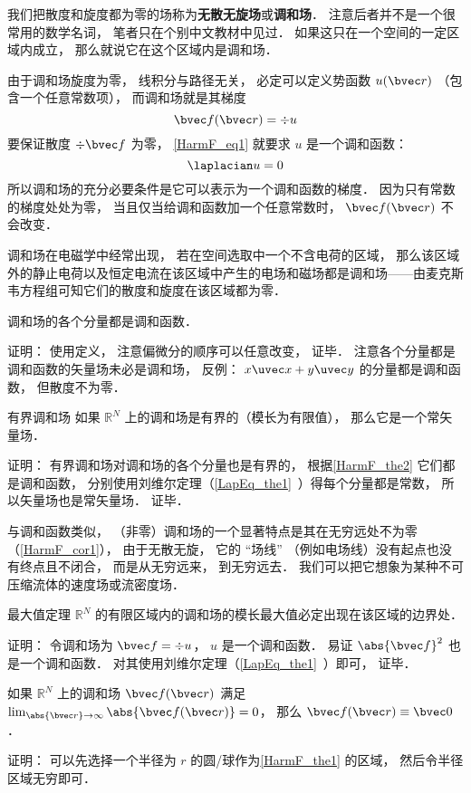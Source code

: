 

我们把散度和旋度都为零的场称为\textbf{无散无旋场}或\textbf{调和场}． 注意后者并不是一个很常用的数学名词， 笔者只在个别中文教材中见过． 如果这只在一个空间的一定区域内成立， 那么就说它在这个区域内是调和场．

由于调和场旋度为零， 线积分与路径无关， 必定可以定义势函数 $u(\bvec r)$ （包含一个任意常数项）， 而调和场就是其梯度
\begin{equation}\label{HarmF_eq1}
\bvec f(\bvec r) = \div u
\end{equation}
要保证散度 $\div \bvec f$ 为零， \autoref{HarmF_eq1} 就要求 $u$ 是一个调和函数：
\begin{equation}
\laplacian u = 0
\end{equation}
所以调和场的充分必要条件是它可以表示为一个调和函数的梯度． 因为只有常数的梯度处处为零， 当且仅当给调和函数加一个任意常数时， $\bvec f(\bvec r)$ 不会改变．

调和场在电磁学中经常出现， 若在空间选取中一个不含电荷的区域， 那么该区域外的静止电荷以及恒定电流在该区域中产生的电场和磁场都是调和场——由麦克斯韦方程组可知它们的散度和旋度在该区域都为零．

\begin{theorem}{}\label{HarmF_the2}
调和场的各个分量都是调和函数．
\end{theorem}
证明： 使用定义， 注意偏微分的顺序可以任意改变， 证毕． 注意各个分量都是调和函数的矢量场未必是调和场， 反例： $x\uvec x + y \uvec y$ 的分量都是调和函数， 但散度不为零．

\begin{corollary}{有界调和场}
如果 $\mathbb R^N$ 上的调和场是有界的（模长为有限值）， 那么它是一个常矢量场．
\end{corollary}
证明： 有界调和场对调和场的各个分量也是有界的， 根据\autoref{HarmF_the2} 它们都是调和函数， 分别使用刘维尔定理（\autoref{LapEq_the1}~）得每个分量都是常数， 所以矢量场也是常矢量场． 证毕．

与调和函数类似， （非零）调和场的一个显著特点是其在无穷远处不为零（\autoref{HarmF_cor1}）， 由于无散无旋， 它的 “场线” （例如电场线）没有起点也没有终点且不闭合， 而是从无穷远来， 到无穷远去． 我们可以把它想象为某种不可压缩流体的速度场或流密度场．

\begin{theorem}{最大值定理}\label{HarmF_the1}
$\mathbb R^N$ 的有限区域内的调和场的模长最大值必定出现在该区域的边界处．
\end{theorem}
证明： 令调和场为 $\bvec f = \div u$， $u$ 是一个调和函数． 易证 $\abs{\bvec f}^2$ 也是一个调和函数． 对其使用刘维尔定理（\autoref{LapEq_the1}~）即可， 证毕．

\begin{corollary}{}\label{HarmF_cor1}
如果 $\mathbb R^N$ 上的调和场 $\bvec f(\bvec r)$ 满足 $\lim_{\abs{\bvec r}\to \infty} \abs{\bvec f(\bvec r)}  = 0$， 那么 $\bvec f(\bvec r) \equiv \bvec 0$．
\end{corollary}
证明： 可以先选择一个半径为 $r$ 的圆/球作为\autoref{HarmF_the1} 的区域， 然后令半径区域无穷即可．
